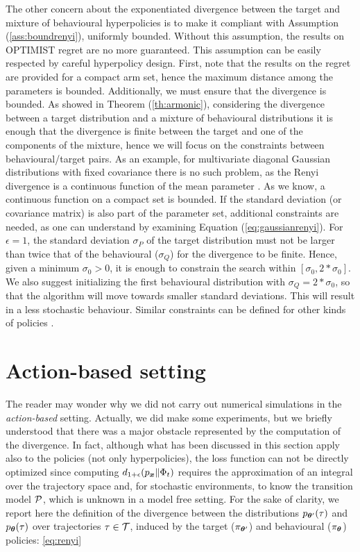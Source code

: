 The other concern about the exponentiated \Renyi divergence between the target and mixture of behavioural hyperpolicies is to make it compliant with Assumption (\ref{ass:boundrenyi}), \ie uniformly bounded. Without this assumption, the results on \gls{OPTIMIST} regret are no more guaranteed. This assumption can be easily respected by careful hyperpolicy design. First, note that the results on the regret are provided for a compact arm set, hence the maximum distance among the parameters is bounded. Additionally, we must ensure that the \Renyi divergence is bounded. As showed in Theorem (\ref{th:armonic}), considering the divergence between a target distribution and a mixture of behavioural distributions it is enough that the divergence is finite between the target and one of the components of the mixture, hence we will focus on the constraints between behavioural/target pairs. As an example, for multivariate diagonal Gaussian distributions with fixed covariance there is no such problem, as the Renyi divergence is a continuous function of the mean parameter \cite{gil2013renyi}. As we know, a continuous function on a compact set is bounded. If the standard deviation (or covariance matrix) is also part of the parameter set, additional constraints are needed, as one can understand by examining Equation (\ref{eq:gaussianrenyi}). For $\epsilon=1$, the standard deviation $\sigma_P$ of the target distribution must not be larger than twice that of the behavioural ($\sigma_Q$) for the divergence to be finite. Hence, given a minimum $\sigma_{0} > 0$, it is enough to constrain the search within $[\sigma_0, 2*\sigma_0]$. We also suggest initializing the first behavioural distribution with $\sigma_Q=2*\sigma_0$, so that the algorithm will move towards smaller standard deviations. This will result in a less stochastic behaviour. Similar constraints can be defined for other kinds of policies \cite{gil2013renyi}. 

\section{Action-based setting}

The reader may wonder why we did not carry out numerical simulations in the \emph{action-based} setting. Actually, we did make some experiments, but we briefly understood that there was a major obstacle represented by the computation of the \Renyi divergence. In fact, although what has been discussed in this section apply also to the policies (not only hyperpolicies), the loss function can not be directly optimized since computing $d_{1+\epsilon}(p_{\boldsymbol{x}}\|\Phi_t)$ requires the approximation of an integral over the trajectory space and, for stochastic environments, to know the transition model $\mathcal{P}$, which is unknown in a model free setting. For the sake of clarity, we report here the definition of the \Renyi divergence between the distributions $p_{\boldsymbol{\theta}'}(\tau)$ and $p_{\boldsymbol{\theta}}(\tau)$ over trajectories $\tau\in\mathcal{T}$, induced by the target ($\pi_{\boldsymbol{\theta}'}$) and behavioural ($\pi_{\boldsymbol{\theta}}$) policies: \ref{eq:renyi}

